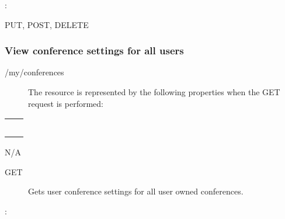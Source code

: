 \documentclass[letterpaper,10pt,english]{sphinxmanual}
\begin{document}
:

\begin{sphinxVerbatim}[commandchars=\\\{\}]
\end{sphinxVerbatim}

 PUT, POST, DELETE


\subsubsection{View conference settings for all users}
\label{\detokenize{restapi:view-conference-settings-for-all-users}}
 /my/conferences
\begin{description}
\item[{}] \leavevmode
The resource is represented by the following properties when the GET request is performed:

\end{description}


\begin{savenotes}\sphinxattablestart
\centering
\begin{tabulary}{\linewidth}[t]{|T|T|}
\hline

&
\\
\hline
{}
&\\
\hline
{}
&\\
\hline
{}
&\\
\hline
{}
&\\
\hline
{}
&\\
\hline
\end{tabulary}
\par
\sphinxattableend\end{savenotes}

 N/A
\begin{description}
\item[{ GET}] \leavevmode
Gets user conference settings for all user owned conferences.

\end{description}

:

\begin{sphinxVerbatim}[commandchars=\\\{\}]
\end{sphinxVerbatim}
\end{document}
